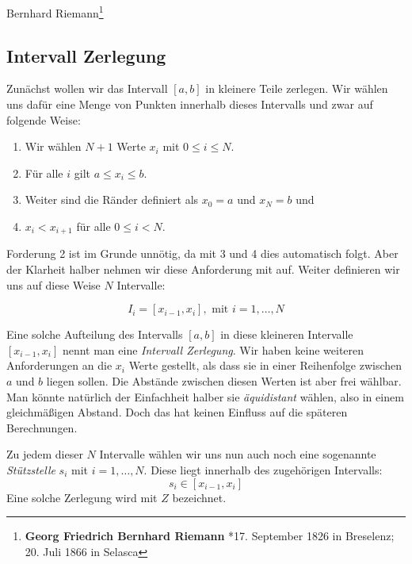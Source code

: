 Bernhard Riemann\footnote{\textbf{Georg Friedrich Bernhard Riemann} *17. September 1826 in Breselenz; 20. Juli 1866 in Selasca} 

\subsection{Intervall Zerlegung}

\begin{definition}\label{def:zerlegung}
Zunächst wollen wir das Intervall $[a,b]$ in kleinere Teile zerlegen. Wir wählen uns dafür eine Menge von Punkten innerhalb dieses Intervalls und zwar auf folgende Weise:

\begin{enumerate}
\item Wir wählen $N+1$ Werte $x_i$ mit $0\le i \le N$.
\item Für alle $i$ gilt $a\le x_i \le b$.
\item Weiter sind die Ränder definiert als $x_0=a$ und $x_N=b$ und
\item $x_i < x_{i+1}$ für alle $0\le i < N$.
\end{enumerate}
Forderung 2 ist im Grunde unnötig, da mit 3 und 4 dies automatisch folgt. Aber der Klarheit halber nehmen wir diese Anforderung mit auf. Weiter definieren wir uns auf diese Weise $N$ Intervalle:

\begin{equation}
I_i = [x_{i-1},x_{i}], \text{ mit } i=1, \dots , N
\end{equation}
\end{definition}

Eine solche Aufteilung des Intervalls $[a,b]$ in diese kleineren Intervalle $[x_{i-1},x_i]$ nennt man eine \emph{Intervall Zerlegung}. Wir haben keine weiteren Anforderungen an die $x_i$ Werte gestellt, als dass sie in einer Reihenfolge zwischen $a$ und $b$ liegen sollen. Die Abstände zwischen diesen Werten ist aber frei wählbar. Man könnte natürlich der Einfachheit halber sie \emph{äquidistant} wählen, also in einem gleichmäßigen Abstand. Doch das hat keinen Einfluss auf die späteren Berechnungen. 

\begin{definition}
Zu jedem dieser $N$ Intervalle wählen wir uns nun auch noch eine sogenannte \emph{Stützstelle} $s_i$ mit $i=1, \dots , N$. Diese liegt innerhalb des zugehörigen Intervalls:
\begin{equation}
s_i \in [x_{i-1},x_{i}]
\end{equation}
Eine solche Zerlegung wird mit $Z$ bezeichnet.
\end{definition}

